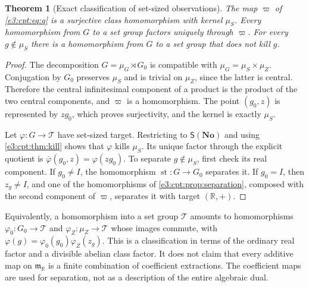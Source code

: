 \documentclass[11pt,letterpaper]{article}
\numberwithin{equation}{section}
\newtheorem{theorem}{Theorem}[section]
\theoremstyle{definition}
\theoremstyle{remark}
\newcommand{\No}{\mathbf{No}}
\newcommand{\R}{\mathbb R}
\newcommand{\mm}{\mathfrak m}
\newcommand{\st}{\operatorname{st}}
\newcommand{\sS}{\mathsf S}
\begin{document}
\begin{theorem}[Exact classification of set-sized observations]\label{e3:cpt:thm:allsmall}
The map $\varpi$ of \cref{e3:cpt:eq:q} is a surjective class homomorphism with
kernel $\mu_S$. Every homomorphism from $G$ to a set group factors uniquely
through $\varpi$. For every $g\notin\mu_S$ there is a homomorphism from $G$ to a
set group that does not kill $g$.
\end{theorem}
\begin{proof}
The decomposition $G=\mu_G\rtimes G_0$ is compatible with
$\mu_G=\mu_S\times\mu_Z$. Conjugation by $G_0$ preserves $\mu_S$ and is trivial
on $\mu_Z$, since the latter is central. Therefore the central infinitesimal
component of a product is the product of the two central components, and
$\varpi$ is a homomorphism. The point $(g_0,z)$ is represented by $zg_0$, which
proves surjectivity, and the kernel is exactly $\mu_S$.

Let $\varphi:G\to\mathcal T$ have set-sized target. Restricting to $\sS(\No)$
and using \cref{e3:cpt:thm:kill} shows that $\varphi$ kills $\mu_S$. Its unique
factor through the explicit quotient is $\overline\varphi(g_0,z)=\varphi(zg_0)$.
To separate $g\notin\mu_S$, first check its real component. If $g_0\ne I$, the
homomorphism $\st:G\to G_0$ separates it. If $g_0=I$, then $z_g\ne I$, and one
of the homomorphisms of \cref{e3:cpt:prop:separation}, composed with the second
component of $\varpi$, separates it with target $(\R,+)$.
\end{proof}

Equivalently, a homomorphism into a set group $\mathcal T$ amounts to
homomorphisms $\varphi_0:G_0\to\mathcal T$ and $\varphi_Z:\mu_Z\to\mathcal T$
whose images commute, with $\varphi(g)=\varphi_0(g_0)\varphi_Z(z_g)$. This is a
classification in terms of the ordinary real factor and a divisible abelian
class factor. It does not claim that every additive map on $\mm_{\R}$ is a
finite combination of coefficient extractions. The coefficient maps are used for
separation, not as a description of the entire algebraic dual.
\end{document}

